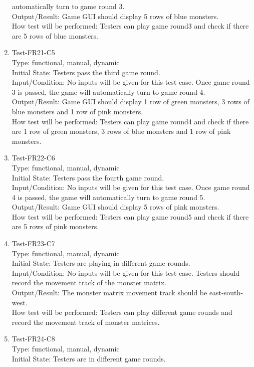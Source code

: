 \documentclass[12pt]{article}
\begin{document}
\begin{enumerate}[1.]
automatically turn to game round 3.\\
Output/Result: Game GUI should display 5 rows of blue monsters.\\
How test will be performed: Testers can play game round3
and check if there are 5
rows of blue monsters.
\item Test-FR21-C5\\
Type: functional, manual, dynamic\\
Initial State: Testers pass the third game round.\\
Input/Condition: No inputs will be given for this test 
case. Once game round 3 is passed, the game will
automatically turn to game round 4.\\
Output/Result: Game GUI should display 1 row of green monsters, 3 rows of blue monsters and 1 row
 of pink monsters.\\
How test will be performed: Testers can play game round4
and check if there are 1 row of green monsters, 3 rows of blue monsters and 1 row of pink monsters.
\item Test-FR22-C6\\
Type: functional, manual, dynamic\\
Initial State: Testers pass the fourth game round.\\
Input/Condition: No inputs will be given for this test 
case. Once game round 4 is passed, the game will
automatically turn to game round 5.\\
Output/Result: Game GUI should display 5 rows
of pink monsters.\\
How test will be performed: Testers can play game round5
and check if there are 5
rows of pink monsters.
\newpage
\item Test-FR23-C7\\
Type: functional, manual, dynamic\\
Initial State: Testers are playing in different game
rounds.\\
Input/Condition: No inputs will be given for this 
test case. Testers should record the movement track of
the monster matrix.\\
Output/Result: The monster matrix movement track should
be east-south-west.\\
How test will be performed: Testers can play different
game rounds and record the movement track of monster 
matrices.
\item Test-FR24-C8\\
Type: functional, manual, dynamic\\
Initial State: Testers are in different game rounds.\\

\end{enumerate}
\end{document}
